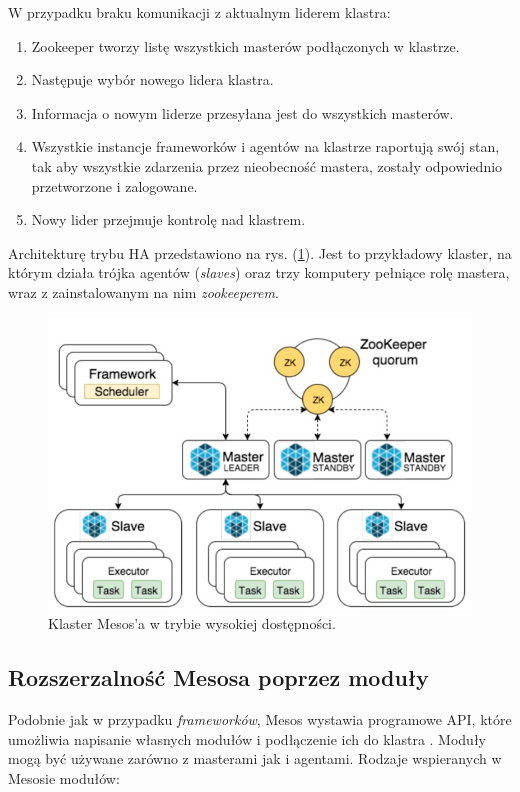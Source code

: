 \documentclass[10pt,a4paper,titlepage,twoside]{report}
\begin{document}
W przypadku braku komunikacji z aktualnym liderem klastra:
\begin{enumerate}
\item Zookeeper tworzy listę wszystkich masterów podłączonych w klastrze.
\item Następuje wybór nowego lidera klastra.
\item Informacja o nowym liderze przesyłana jest do wszystkich masterów.
\item Wszystkie instancje frameworków i agentów na klastrze raportują swój stan, tak aby wszystkie zdarzenia przez nieobecność mastera, zostały odpowiednio przetworzone i zalogowane.
\item Nowy lider przejmuje kontrolę nad klastrem.
\end{enumerate}

Architekturę trybu HA przedstawiono na rys. (\ref{mesos-ha-arch}). Jest to przykładowy klaster, na którym działa trójka agentów (\textit{slaves}) oraz trzy komputery pełniące rolę mastera, wraz z zainstalowanym na nim \textit{zookeeperem}. 
\begin{figure}[!h]
	\centering
	\includegraphics[scale=0.5]{pics/mesos-ha-arch.png}
	\caption{Klaster Mesos'a w trybie wysokiej dostępności.}
	\label{mesos-ha-arch}
\end{figure}

\subsection{Rozszerzalność Mesosa poprzez moduły}

Podobnie jak w przypadku \textit{frameworków}, Mesos wystawia programowe API, które umożliwia napisanie własnych modułów i podłączenie ich do klastra \cite{ad40}. Moduły mogą być używane zarówno z masterami jak i agentami. Rodzaje wspieranych w Mesosie modułów:
\end{document}
